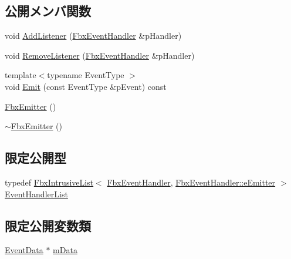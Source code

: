 \subsection*{公開メンバ関数}
\begin{DoxyCompactItemize}
\item 
void \hyperlink{class_fbx_emitter_ab8022a1fd620467f12f493673cfa16a9}{Add\+Listener} (\hyperlink{class_fbx_event_handler}{Fbx\+Event\+Handler} \&p\+Handler)
\item 
void \hyperlink{class_fbx_emitter_a9d5e8f773a85bd9f7a88d9f01eb5463d}{Remove\+Listener} (\hyperlink{class_fbx_event_handler}{Fbx\+Event\+Handler} \&p\+Handler)
\item 
{\footnotesize template$<$typename Event\+Type $>$ }\\void \hyperlink{class_fbx_emitter_ad541e3b06c0beeab71fcf066fc44c78d}{Emit} (const Event\+Type \&p\+Event) const
\item 
\hyperlink{class_fbx_emitter_a33a5aeaa15dd8c9fa66a97b3ab5db550}{Fbx\+Emitter} ()
\item 
\hyperlink{class_fbx_emitter_a58a10b2780c916dedd3ddbbf7ad62f3a}{$\sim$\+Fbx\+Emitter} ()
\end{DoxyCompactItemize}
\subsection*{限定公開型}
\begin{DoxyCompactItemize}
\item 
typedef \hyperlink{class_fbx_intrusive_list}{Fbx\+Intrusive\+List}$<$ \hyperlink{class_fbx_event_handler}{Fbx\+Event\+Handler}, \hyperlink{class_fbx_event_handler_a47139da2cfd5abee91664d75c4fb577cae2c0d7da494cef8d787ee3495e24a6c0}{Fbx\+Event\+Handler\+::e\+Emitter} $>$ \hyperlink{class_fbx_emitter_a9ac3cddf1a246e71957e4b7db6c08fc1}{Event\+Handler\+List}
\end{DoxyCompactItemize}
\subsection*{限定公開変数類}
\begin{DoxyCompactItemize}
\item 
\hyperlink{struct_fbx_emitter_1_1_event_data}{Event\+Data} $\ast$ \hyperlink{class_fbx_emitter_ad2d8605b0a35c0fd4172ac0c55483582}{m\+Data}
\end{DoxyCompactItemize}


